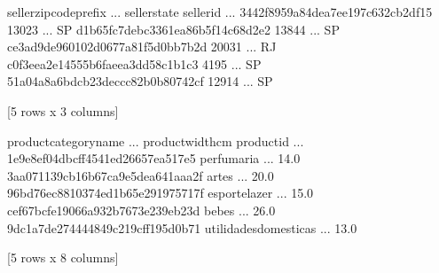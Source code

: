 \documentclass[letterpaper,10pt,english]{jupyterBook}
\begin{document}
\begin{sphinxVerbatim}[commandchars=\\\{\}]
  
\end{sphinxVerbatim}

\begin{sphinxVerbatim}[commandchars=\\\{\}]
                                  seller\PYGZus{}zip\PYGZus{}code\PYGZus{}prefix  ... seller\PYGZus{}state
seller\PYGZus{}id                                                 ...             
3442f8959a84dea7ee197c632cb2df15                   13023  ...           SP
d1b65fc7debc3361ea86b5f14c68d2e2                   13844  ...           SP
ce3ad9de960102d0677a81f5d0bb7b2d                   20031  ...           RJ
c0f3eea2e14555b6faeea3dd58c1b1c3                    4195  ...           SP
51a04a8a6bdcb23deccc82b0b80742cf                   12914  ...           SP

[5 rows x 3 columns]
\end{sphinxVerbatim}

\begin{sphinxVerbatim}[commandchars=\\\{\}]
  
\end{sphinxVerbatim}

\begin{sphinxVerbatim}[commandchars=\\\{\}]
                                  product\PYGZus{}category\PYGZus{}name  ...  product\PYGZus{}width\PYGZus{}cm
product\PYGZus{}id                                               ...                  
1e9e8ef04dbcff4541ed26657ea517e5             perfumaria  ...              14.0
3aa071139cb16b67ca9e5dea641aaa2f                  artes  ...              20.0
96bd76ec8810374ed1b65e291975717f          esporte\PYGZus{}lazer  ...              15.0
cef67bcfe19066a932b7673e239eb23d                  bebes  ...              26.0
9dc1a7de274444849c219cff195d0b71  utilidades\PYGZus{}domesticas  ...              13.0

[5 rows x 8 columns]
\end{sphinxVerbatim}
\end{document}
